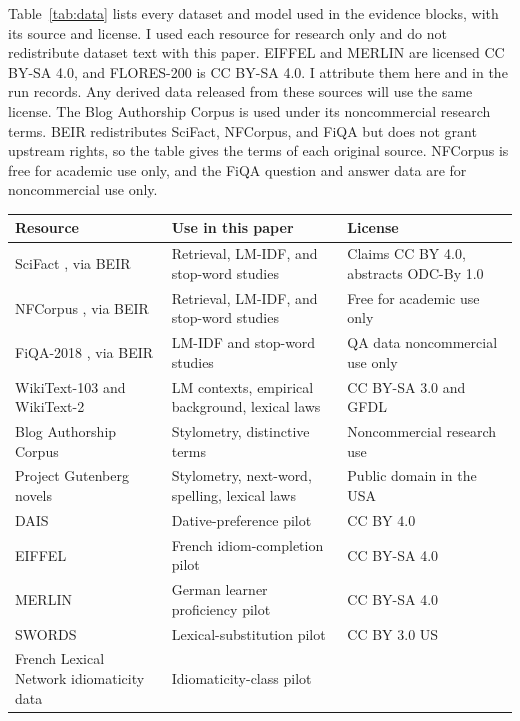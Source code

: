 \documentclass[11pt]{article}
\begin{document}
Table~\ref{tab:data} lists every dataset and model used in the evidence
blocks, with its source and license. I used each resource for research only
and do not redistribute dataset text with this paper. EIFFEL and MERLIN are licensed CC BY-SA 4.0, and FLORES-200 is CC BY-SA
4.0. I attribute them here and in the run records. Any derived data released
from these sources will use the same license. The Blog Authorship Corpus is
used under its noncommercial research terms. BEIR redistributes SciFact,
NFCorpus, and FiQA but does not grant upstream rights, so the table gives the
terms of each original source. NFCorpus is free for academic use only, and
the FiQA question and answer data are for noncommercial use only.

\begin{table}[t]
\centering
\small
\begin{tabular}{p{4.2cm}p{5.4cm}p{4.6cm}}
\toprule
Resource & Use in this paper & License \\
\midrule
SciFact \citep{wadden2020scifact}, via BEIR \citep{thakur2021beir}
 & Retrieval, LM-IDF, and stop-word studies
 & Claims CC BY 4.0, abstracts ODC-By 1.0 \\
NFCorpus \citep{boteva2016nfcorpus}, via BEIR
 & Retrieval, LM-IDF, and stop-word studies
 & Free for academic use only \\
FiQA-2018 \citep{maia2018fiqa}, via BEIR
 & LM-IDF and stop-word studies
 & QA data noncommercial use only \\
WikiText-103 and WikiText-2 \citep{merity2017pointer}
 & LM contexts, empirical background, lexical laws
 & CC BY-SA 3.0 and GFDL \\
Blog Authorship Corpus \citep{schler2006effects,blogcorpus}
 & Stylometry, distinctive terms
 & Noncommercial research use \\
Project Gutenberg novels \citep{gutenberg}
 & Stylometry, next-word, spelling, lexical laws
 & Public domain in the USA \\
DAIS \citep{hawkins2020dais}
 & Dative-preference pilot
 & CC BY 4.0 \\
EIFFEL \citep{eiffel,eiffeldata}
 & French idiom-completion pilot
 & CC BY-SA 4.0 \\
MERLIN \citep{merlin2014,merlindata}
 & German learner proficiency pilot
 & CC BY-SA 4.0 \\
SWORDS \citep{lee2021swords}
 & Lexical-substitution pilot
 & CC BY 3.0 US \\
French Lexical Network idiomaticity data \citep{liu2024idiom,fln}
 & Idiomaticity-class pilot

\end{tabular}
\end{table}
\end{document}
